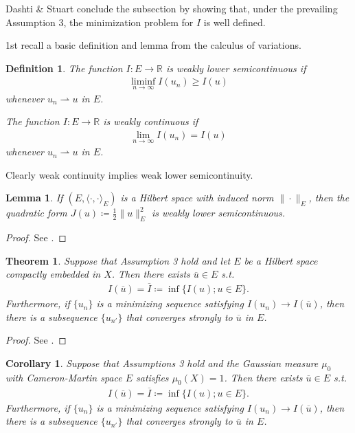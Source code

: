 \documentclass[oneside,11pt]{book}
\numberwithin{equation}{section}
\newtheorem{lemma}{Lemma}[section]
\newtheorem{corollary}{Corollary}[section]
\newtheorem{definition}{Definition}[section]
\newtheorem{theorem}{Theorem}[section]
\begin{document}
Dashti \& Stuart conclude the subsection by showing that, under the prevailing Assumption 3, the minimization problem for $I$ is well defined.

1st recall a basic definition and lemma from the calculus of variations.

\begin{definition}
    The function $I:E\to\mathbb{R}$ is \emph{weakly lower semicontinuous} if
    \begin{align*}
        \liminf_{n\to\infty} I(u_n)\ge I(u)
    \end{align*}
    whenever $u_n\rightharpoonup u$ in $E$.
    
    The function $I:E\to\mathbb{R}$ is \emph{weakly continuous} if
    \begin{align*}
        \lim_{n\to\infty} I(u_n) = I(u)
    \end{align*}
    whenever $u_n\rightharpoonup u$ in $E$.
\end{definition}
Clearly weak continuity implies weak lower semicontinuity.

\begin{lemma}
    If $(E,\langle\cdot,\cdot\rangle_E)$ is a Hilbert space with induced norm $\|\cdot\|_E$, then the quadratic form $J(u)\coloneqq\frac{1}{2}\|u\|_E^2$ is weakly lower semicontinuous.
\end{lemma}

\begin{proof}
    See \cite[p. 362]{Dashti_Stuart2017}.
\end{proof}

\begin{theorem}
    Suppose that Assumption 3 hold and let $E$ be a Hilbert space compactly embedded in $X$. Then there exists $\overline{u}\in E$ s.t.
    \begin{align*}
        I(\overline{u}) = \overline{I}\coloneqq\inf\{I(u);u\in E\}.
    \end{align*}
    Furthermore, if $\{u_n\}$ is a minimizing sequence satisfying $I(u_n)\to I(\overline{u})$, then there is a subsequence $\{u_{n'}\}$ that converges strongly to $\overline{u}$ in $E$.
\end{theorem}

\begin{proof}
    See \cite[pp. 362--363]{Dashti_Stuart2017}.
\end{proof}

\begin{corollary}
    Suppose that Assumptions 3 hold and the Gaussian measure $\mu_0$ with Cameron-Martin space $E$ satisfies $\mu_0(X) = 1$. Then there exists $\overline{u}\in E$ s.t.
    \begin{align*}
        I(\overline{u}) = \overline{I}\coloneqq\inf\{I(u);u\in E\}.
    \end{align*}
    Furthermore, if $\{u_n\}$ is a minimizing sequence satisfying $I(u_n)\to I(\overline{u})$, then there is a subsequence $\{u_{n'}\}$ that converges strongly to $\overline{u}$ in $E$.
\end{corollary}
\end{document}
